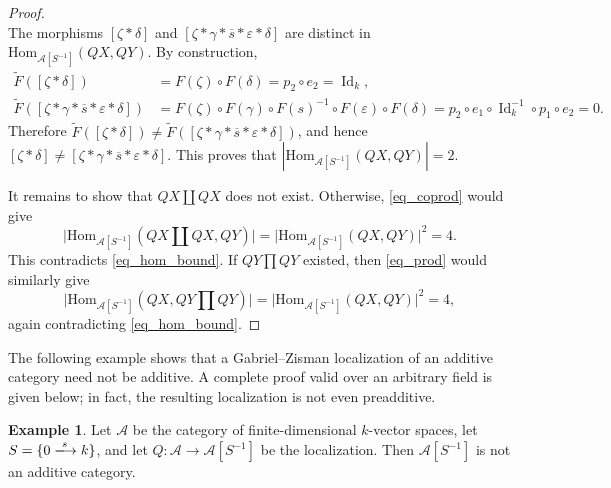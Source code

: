 \documentclass[10pt,a4paper]{amsart}
\theoremstyle{plain}
\theoremstyle{definition}
\newtheorem{example}[theorem]{Example}
\theoremstyle{remark}
\begin{document}
\begin{proof}
\[  \]
  The morphisms $[\zeta\ast\delta]$ and $[\zeta\ast\gamma\ast\overline s\ast \varepsilon\ast\delta]$ are distinct in $\mathrm{Hom}_{\mathcal{A}[S^{-1}]}(QX, QY)$.
  By construction,
  \begin{align*}
    \widetilde F([\zeta\ast\delta])
     & =F(\zeta) \circ F(\delta)
    =p_2\circ e_2
    =\operatorname{Id}_k,                                                             \\
    \widetilde F([\zeta\ast\gamma\ast\overline s\ast \varepsilon\ast\delta])
     & =F(\zeta) \circ F(\gamma) \circ F(s)^{-1} \circ F(\varepsilon) \circ F(\delta)
    =p_2\circ e_1\circ \operatorname{Id}_k^{-1}\circ p_1\circ e_2
    =0.
  \end{align*}
  Therefore $\widetilde F([\zeta\ast\delta]) \neq \widetilde F([\zeta\ast\gamma\ast\overline s\ast \varepsilon\ast\delta])$, and hence $[\zeta\ast\delta] \neq [\zeta\ast\gamma\ast\overline s\ast \varepsilon\ast\delta]$.
  This proves that $\left| \mathrm{Hom}_{\mathcal A[S^{-1}]}(QX,QY) \right|=2$.

  \medskip

  It remains to show that $QX \coprod QX$ does not exist.
  Otherwise, \eqref{eq_coprod} would give
  \[
    \big|\mathrm{Hom}_{\mathcal A[S^{-1}]}(QX\coprod QX,QY)\big| = \big|\mathrm{Hom}_{\mathcal A[S^{-1}]}(QX,QY)\big|^2 = 4.
  \]
  This contradicts \eqref{eq_hom_bound}.
  If $QY\prod QY$ existed, then \eqref{eq_prod} would similarly give
  \[
    \big|\mathrm{Hom}_{\mathcal A[S^{-1}]}(QX,QY\prod QY)\big|
    =\big|\mathrm{Hom}_{\mathcal A[S^{-1}]}(QX,QY)\big|^2=4,
  \]
  again contradicting \eqref{eq_hom_bound}.
\end{proof}

The following example shows that a Gabriel--Zisman localization of an additive category need not be additive.
A complete proof valid over an arbitrary field is given below; in fact, the resulting localization is not even preadditive.

\begin{example}\label{ex:vector-space-nonpreadditive-localization}
  Let $\mathcal A$ be the category of finite-dimensional $k$-vector spaces, let $S = \{0 \xlongrightarrow s k\}$, and let $Q : \mathcal{A} \longrightarrow \mathcal{A}[S^{-1}]$ be the localization.
  Then $\mathcal A[S^{-1}]$ is not an additive category.
\end{example}
\end{document}
